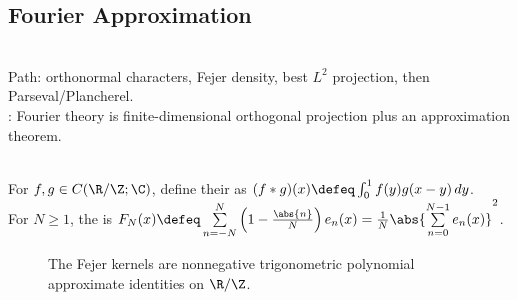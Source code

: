 \subsection{Fourier Approximation}

\begin{perspective} \label{per:fourier-plancherel-roadmap-tao} \\
Path: orthonormal characters, Fejer density, best $L^2$ projection, then Parseval/Plancherel.\\
: Fourier theory is finite-dimensional orthogonal projection plus an approximation theorem.
\end{perspective}

\begin{definition} \label{def:periodic-convolution-and-fejer-kernel} \\
For $f,g\in C(\R/\Z;\C)$, define their  as $(f*g)(x)\defeq\int_0^1 f(y)g(x-y)\,dy$.\\
For $N\geq1$, the  is $F_N(x)\defeq \sum\limits_{n=-N}^{N}\left(1-\frac{\abs{n}}{N}\right)e_n(x) =\frac{1}{N}\abs{\sum\limits_{n=0}^{N-1}e_n(x)}^2$.
\end{definition}

\begin{figure}[H]
  \centering
  
  \caption{The Fejer kernels are nonnegative trigonometric polynomial approximate identities on $\R/\Z$.}
  \label{fig:fejer-kernel-periodic-approx-identity}
\end{figure}

